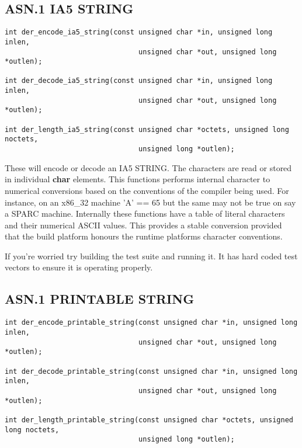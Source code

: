 \documentclass[a4paper]{book}
\begin{document}
\subsection{ASN.1 IA5 STRING}

\begin{verbatim}
int der_encode_ia5_string(const unsigned char *in, unsigned long inlen,
                                unsigned char *out, unsigned long *outlen);

int der_decode_ia5_string(const unsigned char *in, unsigned long inlen,
                                unsigned char *out, unsigned long *outlen);

int der_length_ia5_string(const unsigned char *octets, unsigned long noctets, 
                                unsigned long *outlen);
\end{verbatim}

These will encode or decode an IA5 STRING.  The characters are read or stored in individual \textbf{char} elements.  This functions performs internal character
to numerical conversions based on the conventions of the compiler being used.  For instance, on an x86\_32 machine 'A' == 65 but the same may not be true on 
say a SPARC machine.  Internally these functions have a table of literal characters and their numerical ASCII values.  This provides a stable conversion provided
that the build platform honours the runtime platforms character conventions.

If you're worried try building the test suite and running it.  It has hard coded test vectors to ensure it is operating properly. 

\subsection{ASN.1 PRINTABLE STRING}

\begin{verbatim}
int der_encode_printable_string(const unsigned char *in, unsigned long inlen,
                                unsigned char *out, unsigned long *outlen);

int der_decode_printable_string(const unsigned char *in, unsigned long inlen,
                                unsigned char *out, unsigned long *outlen);

int der_length_printable_string(const unsigned char *octets, unsigned long noctets, 
                                unsigned long *outlen);
\end{verbatim}
\end{document}
